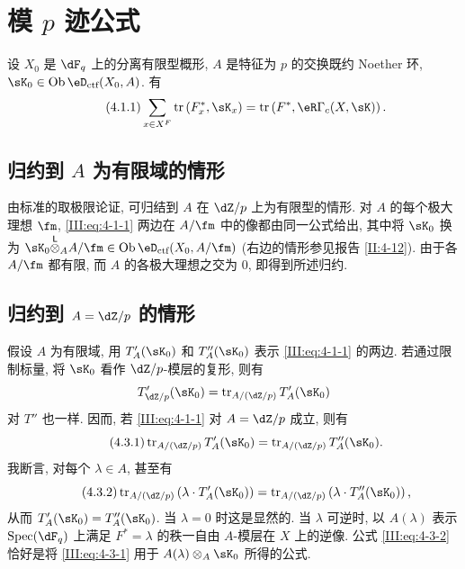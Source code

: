 \section{模 \texorpdfstring{$p$}{p} 迹公式}\label{III:4}

\begin{theorem_}\label{III:4-1}
设 $X_0$ 是 $\dF_q$ 上的分离有限型概形, $A$ 是特征为 $p$ 的交换既约 Noether 环, $\sK_0\in\ob\eD_\textnormal{ctf}(X_0,A)$. 有
\begin{equation*}\tag{4.1.1}\label{III:eq:4-1-1}
  \sum_{x\in X^F} \tr\left(F_x^*,\sK_x\right) = \tr\left(F^*,\eR\Gamma_c(X,\sK)\right) \text{.}
\end{equation*}
\end{theorem_}

\subsection{归约到 \texorpdfstring{$A$}{A} 为有限域的情形}\label{III:4-2}

由标准的取极限论证, 可归结到 $A$ 在 $\dZ/p$ 上为有限型的情形. 对 $A$ 的每个极大理想 $\fm$, \eqref{III:eq:4-1-1} 两边在 $A/\fm$ 中的像都由同一公式给出, 其中将 $\sK_0$ 换为 $\sK_0\lotimes_A A/\fm\in\ob\eD_\text{ctf}(X_0,A/\fm)$ (右边的情形参见报告 \ref{II:4-12}). 由于各 $A/\fm$ 都有限, 而 $A$ 的各极大理想之交为 $0$, 即得到所述归约.

\subsection{归约到 \texorpdfstring{$A=\dZ/p$}{A=Z/p} 的情形}\label{III:4-3}

假设 $A$ 为有限域, 用 $T_A'(\sK_0)$ 和 $T_A''(\sK_0)$ 表示 \eqref{III:eq:4-1-1} 的两边. 若通过限制标量, 将 $\sK_0$ 看作 $\dZ/p$-模层的复形, 则有
\[
  T_{\dZ/p}'(\sK_0) = \tr_{A/(\dZ/p)} T_A'(\sK_0)
\]
对 $T''$ 也一样. 因而, 若 \eqref{III:eq:4-1-1} 对 $A=\dZ/p$ 成立, 则有
\begin{equation*}\tag{4.3.1}\label{III:eq:4-3-1}
  \tr_{A/(\dZ/p)} T_A'(\sK_0) = \tr_{A/(\dZ/p)} T_A''(\sK_0) \text{.}
\end{equation*}
我断言, 对每个 $\lambda\in A$, 甚至有
\begin{equation*}\tag{4.3.2}\label{III:eq:4-3-2}
  \tr_{A/(\dZ/p)}\left(\lambda\cdot T_A'(\sK_0)\right) = \tr_{A/(\dZ/p)}\left(\lambda\cdot T_A''(\sK_0)\right) \text{,}
\end{equation*}
从而 $T_A'(\sK_0) = T_A''(\sK_0)$. 当 $\lambda=0$ 时这是显然的. 当 $\lambda$ 可逆时, 以 $A(\lambda)$ 表示 $\spec(\dF_q)$ 上满足 $F^*=\lambda$ 的秩一自由 $A$-模层在 $X$ 上的逆像. 公式 \eqref{III:eq:4-3-2} 恰好是将 \eqref{III:eq:4-3-1} 用于 $A(\lambda)\otimes_A \sK_0$ 所得的公式.

